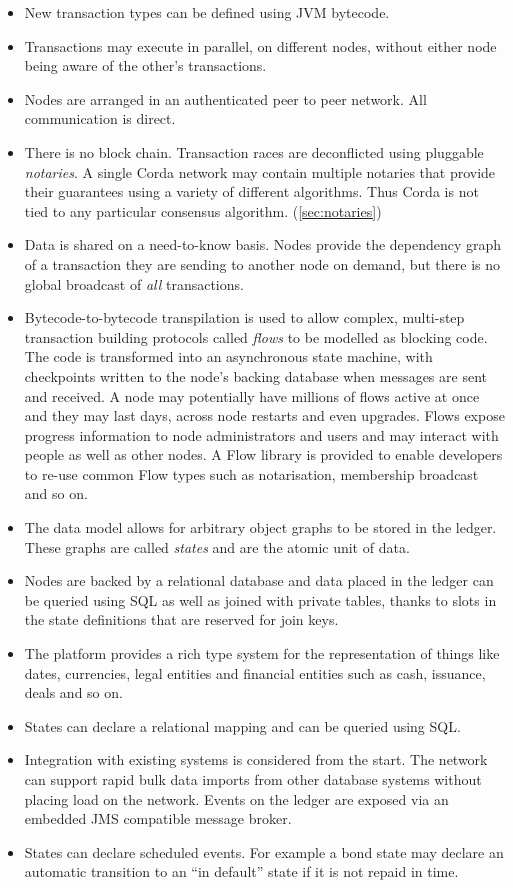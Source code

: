 \documentclass{article}
\begin{document}
\begin{itemize}
\item New transaction types can be defined using JVM\cite{JVM} bytecode.
\item Transactions may execute in parallel, on different nodes, without either node being aware of the other's transactions.
\item Nodes are arranged in an authenticated peer to peer network. All communication is direct.
\item There is no block chain\cite{Bitcoin}. Transaction races are deconflicted using pluggable \emph{notaries}. A single
Corda network may contain multiple notaries that provide their guarantees using a variety of different algorithms. Thus
Corda is not tied to any particular consensus algorithm. (\cref{sec:notaries})
\item Data is shared on a need-to-know basis. Nodes provide the dependency graph of a transaction they are sending to
another node on demand, but there is no global broadcast of \emph{all} transactions.
\item Bytecode-to-bytecode transpilation is used to allow complex, multi-step transaction building protocols called
\emph{flows} to be modelled as blocking code. The code is transformed into an asynchronous state machine, with
checkpoints written to the node's backing database when messages are sent and received. A node may potentially have
millions of flows active at once and they may last days, across node restarts and even upgrades. Flows expose progress
information to node administrators and users and may interact with people as well as other nodes. A Flow library is provided
to enable developers to re-use common Flow types such as notarisation, membership broadcast and so on.
\item The data model allows for arbitrary object graphs to be stored in the ledger. These graphs are called \emph{states} and are the atomic unit of data.
\item Nodes are backed by a relational database and data placed in the ledger can be queried using SQL as well as joined
with private tables, thanks to slots in the state definitions that are reserved for join keys.
\item The platform provides a rich type system for the representation of things like dates, currencies, legal entities and
financial entities such as cash, issuance, deals and so on.
\item States can declare a relational mapping and can be queried using SQL.
\item Integration with existing systems is considered from the start. The network can support rapid bulk data imports
from other database systems without placing load on the network. Events on the ledger are exposed via an embedded JMS
compatible message broker.
\item States can declare scheduled events. For example a bond state may declare an automatic transition to an
``in default'' state if it is not repaid in time.
\end{itemize}
\end{document}
